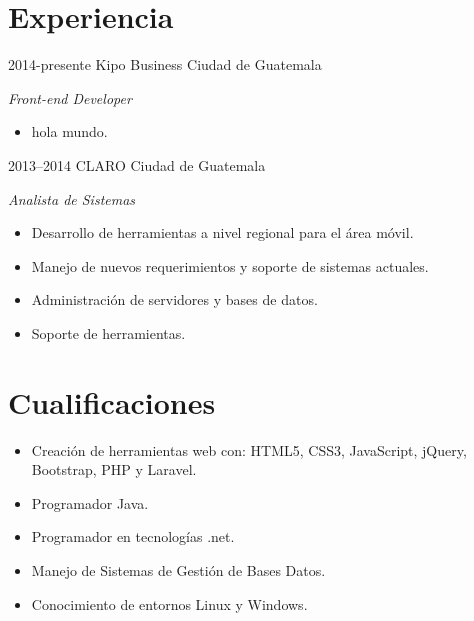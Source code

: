 \documentclass[]{friggeri-cv} %
\begin{document}
\section{Experiencia}
\begin{entrylist}
\entry
	{2014-presente}
	{Kipo Business}
	{Ciudad de Guatemala}
	{\emph{Front-end Developer} \\
	
	\begin{itemize}
		\item hola mundo.
	\end{itemize}
	
	}
	
\entry
	{2013--2014}
	{CLARO}
	{Ciudad de Guatemala}
	{\emph{Analista de Sistemas} \\
	
	\begin{itemize}
		\item Desarrollo de herramientas a nivel regional para el área móvil. 
		\item Manejo de nuevos requerimientos y soporte de sistemas actuales.
		\item Administración de servidores y bases de datos.
		\item Soporte de herramientas.
	\end{itemize}
	
	}



\end{entrylist}


\section{Cualificaciones}
\begin{itemize}
	\item Creación de herramientas web con: HTML5, CSS3, JavaScript, jQuery, Bootstrap, PHP y Laravel.
	\item Programador Java.
	\item Programador en tecnologías .net.
	\item Manejo de Sistemas de Gestión de Bases Datos.
	\item Conocimiento de entornos Linux y Windows.

\end{itemize}
\end{document}

